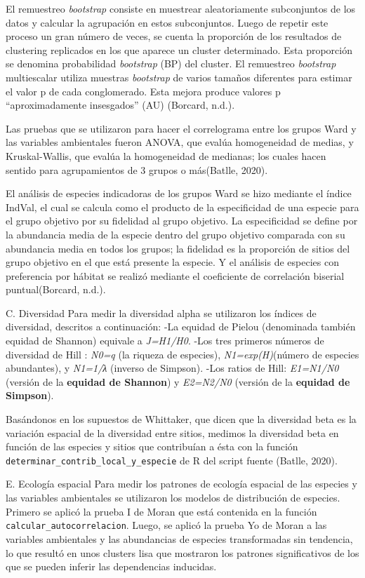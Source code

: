 \documentclass[11pt,]{article}
\begin{document}
El remuestreo \emph{bootstrap} consiste en muestrear aleatoriamente
subconjuntos de los datos y calcular la agrupación en estos
subconjuntos. Luego de repetir este proceso un gran número de veces, se
cuenta la proporción de los resultados de clustering replicados en los
que aparece un cluster determinado. Esta proporción se denomina
probabilidad \emph{bootstrap} (BP) del cluster. El remuestreo
\emph{bootstrap} multiescalar utiliza muestras \emph{bootstrap} de
varios tamaños diferentes para estimar el valor p de cada conglomerado.
Esta mejora produce valores p ``aproximadamente insesgados'' (AU)
(Borcard, n.d.).

Las pruebas que se utilizaron para hacer el correlograma entre los
grupos Ward y las variables ambientales fueron ANOVA, que evalúa
homogeneidad de medias, y Kruskal-Wallis, que evalúa la homogeneidad de
medianas; los cuales hacen sentido para agrupamientos de 3 grupos o
más(Batlle, 2020).

El análisis de especies indicadoras de los grupos Ward se hizo mediante
el índice IndVal, el cual se calcula como el producto de la
especificidad de una especie para el grupo objetivo por su fidelidad al
grupo objetivo. La especificidad se define por la abundancia media de la
especie dentro del grupo objetivo comparada con su abundancia media en
todos los grupos; la fidelidad es la proporción de sitios del grupo
objetivo en el que está presente la especie. Y el análisis de especies
con preferencia por hábitat se realizó mediante el coeficiente de
correlación biserial puntual(Borcard, n.d.).

C. Diversidad Para medir la diversidad alpha se utilizaron los índices
de diversidad, descritos a continuación: -La equidad de Pielou
(denominada también equidad de Shannon) equivale a \emph{J=H1/H0}. -Los
tres primeros números de diversidad de Hill : \emph{N0=q} (la riqueza de
especies), \emph{N1=exp(H)}(número de especies abundantes), y
\emph{N1=1/λ} (inverso de Simpson). -Los ratios de Hill: \emph{E1=N1/N0}
(versión de la \textbf{equidad de Shannon}) y \emph{E2=N2/N0} (versión
de la \textbf{equidad de Simpson}).

Basándonos en los supuestos de Whittaker, que dicen que la diversidad
beta es la variación espacial de la diversidad entre sitios, medimos la
diversidad beta en función de las especies y sitios que contribuían a
ésta con la función \texttt{determinar\_contrib\_local\_y\_especie} de R
del script fuente (Batlle, 2020).

E. Ecología espacial Para medir los patrones de ecología espacial de las
especies y las variables ambientales se utilizaron los modelos de
distribución de especies. Primero se aplicó la prueba I de Moran que
está contenida en la función \texttt{calcular\_autocorrelacion}. Luego,
se aplicó la prueba Yo de Moran a las variables ambientales y las
abundancias de especies transformadas sin tendencia, lo que resultó en
unos clusters lisa que mostraron los patrones significativos de los que
se pueden inferir las dependencias inducidas.
\end{document}
